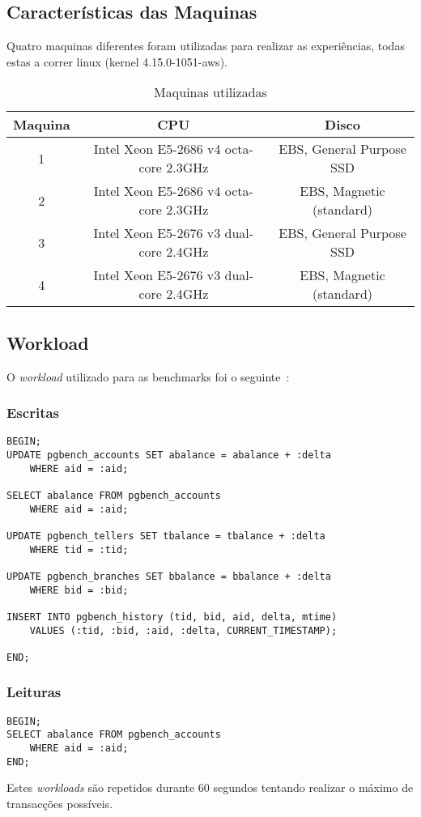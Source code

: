 \subsection{Características das Maquinas}

Quatro maquinas diferentes foram utilizadas para realizar as experiências, todas estas a correr linux (kernel 4.15.0-1051-aws).

\begin{table}
    \centering
    \begin{tabular}{||c|c|c||}
        \hline
         Maquina & CPU & Disco \\\hline
         1 & Intel Xeon E5-2686 v4 octa-core 2.3GHz & EBS, General Purpose SSD \\\hline
         2 & Intel Xeon E5-2686 v4 octa-core 2.3GHz & EBS, Magnetic (standard) \\\hline
         3 & Intel Xeon E5-2676 v3 dual-core 2.4GHz & EBS, General Purpose SSD \\\hline
         4 & Intel Xeon E5-2676 v3 dual-core 2.4GHz & EBS, Magnetic (standard) \\\hline
    \end{tabular}
    \label{tab:maquinas}
    \caption{Maquinas utilizadas}
\end{table}

\subsection{Workload}

O \textit{workload} utilizado para as benchmarks foi o seguinte~\cite{pgbench}:
\subsubsection{Escritas}
\begin{verbatim}
BEGIN;
UPDATE pgbench_accounts SET abalance = abalance + :delta 
    WHERE aid = :aid;
    
SELECT abalance FROM pgbench_accounts 
    WHERE aid = :aid;
    
UPDATE pgbench_tellers SET tbalance = tbalance + :delta 
    WHERE tid = :tid;
    
UPDATE pgbench_branches SET bbalance = bbalance + :delta 
    WHERE bid = :bid;
    
INSERT INTO pgbench_history (tid, bid, aid, delta, mtime)
    VALUES (:tid, :bid, :aid, :delta, CURRENT_TIMESTAMP);
    
END;
\end{verbatim}

\subsubsection{Leituras}
\begin{verbatim}
BEGIN;
SELECT abalance FROM pgbench_accounts 
    WHERE aid = :aid;
END;
\end{verbatim}

Estes \textit{workloads} são repetidos durante 60 segundos tentando realizar o máximo de transacções possíveis.


